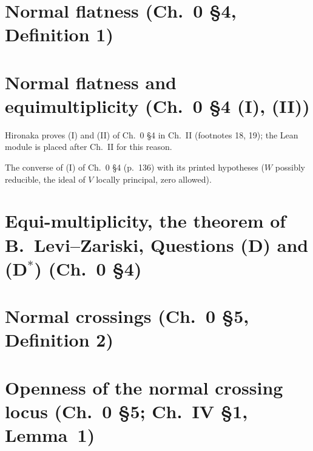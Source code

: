 
\section{Normal flatness (Ch.~0 \S4, Definition 1)}

\section{Normal flatness and equimultiplicity (Ch.~0 \S4 (I), (II))}

Hironaka proves (I) and (II) of Ch.~0 \S4 in Ch.~II (footnotes 18, 19); the Lean module is
placed after Ch.~II for this reason.


The converse of (I) of Ch.~0 \S4 (p.~136) with its printed hypotheses ($W$ possibly reducible, the ideal of $V$ locally
principal, zero allowed).

\section{Equi-multiplicity, the theorem of B.~Levi--Zariski, Questions (D) and (D$^*$) (Ch.~0 \S4)}

\section{Normal crossings (Ch.~0 \S5, Definition 2)}

\section{Openness of the normal crossing locus (Ch.~0 \S5; Ch.~IV \S1, Lemma~1)}

